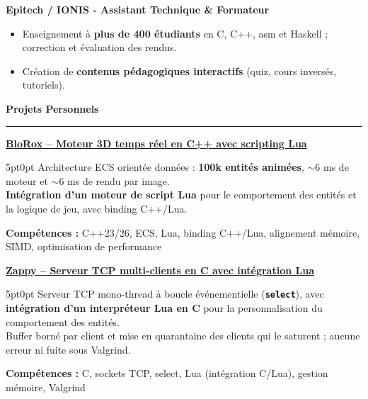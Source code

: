 \documentclass[9pt]{extarticle}
\begin{document}
\par\vspace{5pt}

{\bfseries Epitech / IONIS - Assistant Technique \& Formateur}
\begin{itemize}[noitemsep, topsep=0pt]
	\item Enseignement à {\bfseries plus de 400 étudiants} en C, C++, asm et Haskell ; correction et évaluation des rendus.
	\item Création de {\bfseries contenus pédagogiques interactifs} (quiz, cours inversés, tutoriels).
\end{itemize}

\par\vspace{5pt}

{\large\bfseries Projets Personnels}
\par\vspace{-8pt}
\rule{\linewidth}{0.4pt}
\par\vspace{5pt}

\underline{\bfseries \href{https://github.com/paulogarithm/blorox}{BloRox} -- Moteur 3D temps réel en C++ avec scripting Lua}
\par
\begin{adjustwidth}{5pt}{0pt}
	Architecture ECS orientée données : {\bfseries 100k entités animées}, $\sim$6 ms de moteur et $\sim$6 ms de rendu par image. \\
	{\bfseries Intégration d'un moteur de script Lua} pour le comportement des entités et la logique de jeu, avec binding C++/Lua.
\end{adjustwidth}
\par
{\bfseries Compétences :} C++23/26, ECS, Lua, binding C++/Lua, alignement mémoire, SIMD, optimisation de performance

\par\vspace{8pt}

\underline{\bfseries Zappy -- Serveur TCP multi-clients en C avec intégration Lua}
\par
\begin{adjustwidth}{5pt}{0pt}
    Serveur TCP mono-thread à boucle événementielle ({\bfseries \texttt{select}}), avec {\bfseries intégration d'un interpréteur Lua en C} pour la personnalisation du comportement des entités. \\
    Buffer borné par client et mise en quarantaine des clients qui le saturent ; aucune erreur ni fuite sous Valgrind.
\end{adjustwidth}
\par
{\bfseries Compétences :} C, sockets TCP, select, Lua (intégration C/Lua), gestion mémoire, Valgrind
\end{document}
